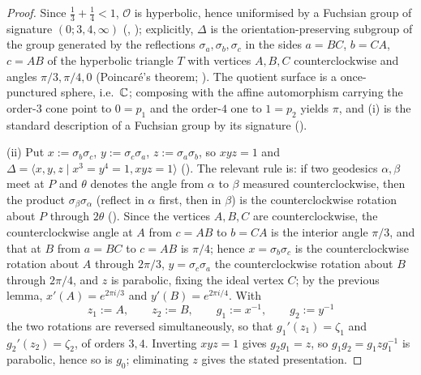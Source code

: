\begin{proof}
Since $\tfrac13+\tfrac14 < 1$, $\mathcal O$ is hyperbolic, hence uniformised by a Fuchsian group of signature $(0;3,4,\infty)$ (\cite[Ch.\ 13]{Thu97}, \cite[Ch.\ 10]{Bea83}); explicitly, $\Delta$ is the orientation-preserving subgroup of the group generated by the reflections $\sigma_a,\sigma_b,\sigma_c$ in the sides $a=BC$, $b=CA$, $c=AB$ of the hyperbolic triangle $T$ with vertices $A,B,C$ counterclockwise and angles $\pi/3,\pi/4,0$ (Poincar\'e's theorem; \cite[Ch.\ 7, 9--10]{Bea83}). The quotient surface is a once-punctured sphere, i.e.\ $\mathbb{C}$; composing with the affine automorphism carrying the order-$3$ cone point to $0=p_1$ and the order-$4$ one to $1=p_2$ yields $\pi$, and (i) is the standard description of a Fuchsian group by its signature (\cite[Ch.\ 10]{Bea83}).

(ii) Put $x := \sigma_b\sigma_c$, $y := \sigma_c\sigma_a$, $z := \sigma_a\sigma_b$, so $xyz=1$ and $\Delta = \langle x,y,z \mid x^3=y^4=1, xyz=1\rangle$ (\cite[Ch.\ 10]{Bea83}). The relevant rule is: if two geodesics $\alpha,\beta$ meet at $P$ and $\theta$ denotes the angle from $\alpha$ to $\beta$ measured counterclockwise, then the product $\sigma_\beta\sigma_\alpha$ (reflect in $\alpha$ first, then in $\beta$) is the counterclockwise rotation about $P$ through $2\theta$ (\cite[Ch.\ 7]{Bea83}). Since the vertices $A,B,C$ are counterclockwise, the counterclockwise angle at $A$ from $c=AB$ to $b=CA$ is the interior angle $\pi/3$, and that at $B$ from $a=BC$ to $c=AB$ is $\pi/4$; hence $x=\sigma_b\sigma_c$ is the counterclockwise rotation about $A$ through $2\pi/3$, $y=\sigma_c\sigma_a$ the counterclockwise rotation about $B$ through $2\pi/4$, and $z$ is parabolic, fixing the ideal vertex $C$; by the previous lemma, $x'(A) = e^{2\pi i/3}$ and $y'(B) = e^{2\pi i/4}$. With
\[
z_1 := A, \qquad z_2 := B, \qquad g_1 := x^{-1}, \qquad g_2 := y^{-1}
\]
the two rotations are reversed simultaneously, so that $g_1'(z_1) = \zeta_1$ and $g_2'(z_2) = \zeta_2$, of orders $3,4$. Inverting $xyz=1$ gives $g_2g_1 = z$, so $g_1g_2 = g_1zg_1^{-1}$ is parabolic, hence so is $g_0$; eliminating $z$ gives the stated presentation.


\end{proof}
